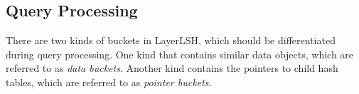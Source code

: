 \vspace{-0.1in}
\subsection{Query Processing}
\label{sec:layerlsh:query}

There are two kinds of buckets in LayerLSH, which should be differentiated during query processing. One kind that contains similar data objects, which are referred to as \emph{data buckets}. Another kind contains the pointers to child hash tables, which are referred to as \emph{pointer buckets}.


